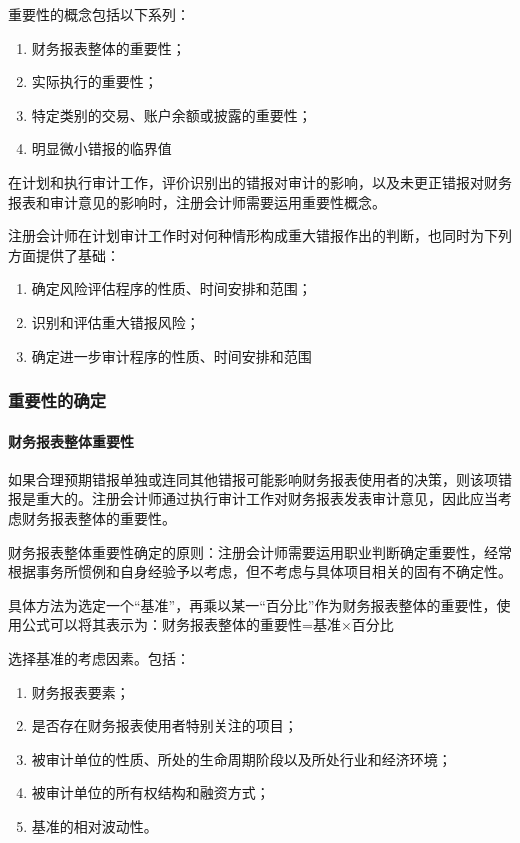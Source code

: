 \documentclass[UTF8,12pt]{ctexart}
\numberwithin{equation}{section} %
\numberwithin{figure}{section}
\numberwithin{table}{section}
\begin{document}
	
	重要性的概念包括以下系列：
	\begin{enumerate}
		\item 财务报表整体的重要性；
		
		\item 实际执行的重要性；
		
		\item 特定类别的交易、账户余额或披露的重要性；
		
		\item 明显微小错报的临界值
	\end{enumerate}

	
	在计划和执行审计工作，评价识别出的错报对审计的影响，以及未更正错报对财务报表和审计意见的影响时，注册会计师需要运用重要性概念。
	
	注册会计师在计划审计工作时对何种情形构成重大错报作出的判断，也同时为下列方面提供了基础：
	\begin{enumerate}
		\item 确定风险评估程序的性质、时间安排和范围；
	
		\item 识别和评估重大错报风险；
	
		\item 确定进一步审计程序的性质、时间安排和范围
		
	\end{enumerate}
	
	\subsubsection{重要性的确定}
	\paragraph{财务报表整体重要性}
	如果合理预期错报单独或连同其他错报可能影响财务报表使用者的决策，则该项错报是重大的。注册会计师通过执行审计工作对财务报表发表审计意见，因此应当考虑财务报表整体的重要性。
	
	
	财务报表整体重要性确定的原则：注册会计师需要运用职业判断确定重要性，经常根据事务所惯例和自身经验予以考虑，但不考虑与具体项目相关的固有不确定性。
	
	具体方法为选定一个“基准”，再乘以某一“百分比”作为财务报表整体的重要性，使用公式可以将其表示为：财务报表整体的重要性=基准×百分比
	
	选择基准的考虑因素。包括：
	\begin{enumerate}
		\item 财务报表要素；
		
		\item 是否存在财务报表使用者特别关注的项目；
		
		\item 被审计单位的性质、所处的生命周期阶段以及所处行业和经济环境；
		
		\item 被审计单位的所有权结构和融资方式；
		
		\item 基准的相对波动性。
	\end{enumerate}
	
\end{document}
